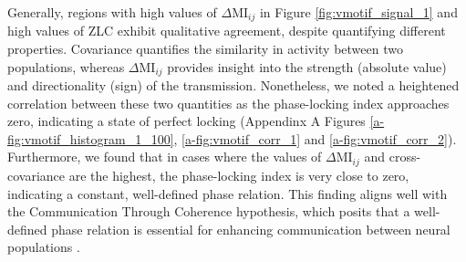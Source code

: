 \documentclass[../main.tex]{subfiles}
\begin{document}
Generally, regions with high values of $\Delta$MI$_{ij}$ in Figure \ref{fig:vmotif_signal_1} and high values of ZLC exhibit qualitative agreement, despite quantifying different properties.
Covariance quantifies the similarity in activity between two populations, whereas $\Delta$MI$_{ij}$ provides insight into the strength (absolute value) and directionality (sign) of the transmission.
Nonetheless, we noted a heightened correlation between these two quantities as the phase-locking index approaches zero, indicating a state of perfect locking (Appendinx A Figures \ref{a-fig:vmotif_histogram_1_100}, \ref{a-fig:vmotif_corr_1} and \ref{a-fig:vmotif_corr_2}).
Furthermore, we found that in cases where the values of $\Delta$MI$_{ij}$ and cross-covariance are the highest, the phase-locking index is very close to zero, indicating a constant, well-defined phase relation.
This finding aligns well with the Communication Through Coherence hypothesis, which posits that a well-defined phase relation is essential for enhancing communication between neural populations \citep{fries_rhythms_2015}.
\end{document}
